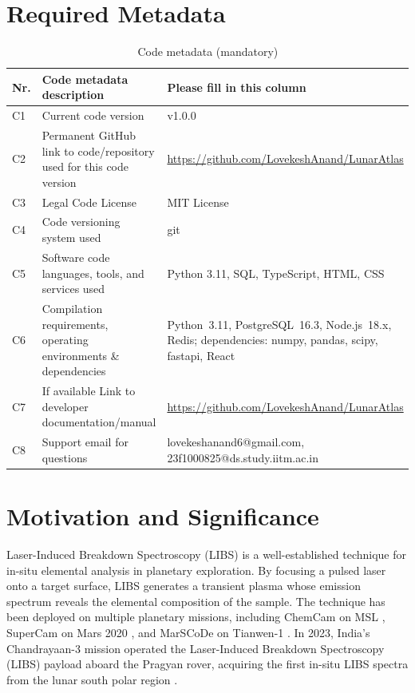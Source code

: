 \documentclass[final,5p,twocolumn,a4paper]{elsarticle}
\begin{document}
\section*{Required Metadata}

\begin{table}[!ht]
\centering
\small
\begin{tabular}{|l|p{7.5cm}|p{7.5cm}|}
\hline
\textbf{Nr.} & \textbf{Code metadata description} & \textbf{Please fill in this column} \\
\hline
C1 & Current code version & v1.0.0 \\
\hline
C2 & Permanent GitHub link to code/repository used for this code version & \href{https://github.com/LovekeshAnand/LunarAtlas}{https://github.com/LovekeshAnand/LunarAtlas} \\
\hline
C3 & Legal Code License & MIT License \\
\hline
C4 & Code versioning system used & git \\
\hline
C5 & Software code languages, tools, and services used & Python 3.11, SQL, TypeScript, HTML, CSS \\
\hline
C6 & Compilation requirements, operating environments \& dependencies & Python~3.11, PostgreSQL~16.3, Node.js~18.x, Redis; dependencies: numpy, pandas, scipy, fastapi, React \\
\hline
C7 & If available Link to developer documentation/manual & \href{https://github.com/LovekeshAnand/LunarAtlas}{https://github.com/LovekeshAnand/LunarAtlas} \\
\hline
C8 & Support email for questions & lovekeshanand6@gmail.com, 23f1000825@ds.study.iitm.ac.in \\
\hline
\end{tabular}
\caption{Code metadata (mandatory)}
\label{table:metadata} 
\end{table}

\section{Motivation and Significance}

Laser-Induced Breakdown Spectroscopy (LIBS) is a well-established technique for in-situ elemental analysis in planetary exploration. By focusing a pulsed laser onto a target surface, LIBS generates a transient plasma whose emission spectrum reveals the elemental composition of the sample. The technique has been deployed on multiple planetary missions, including ChemCam on MSL \cite{maurice2012chemcam, wiens2012chemcam}, SuperCam on Mars 2020 \cite{maurice2021supercam, wiens2021supercam}, and MarSCoDe on Tianwen-1 \cite{xu2021marscode}. In 2023, India's Chandrayaan-3 mission operated the Laser-Induced Breakdown Spectroscopy (LIBS) payload aboard the Pragyan rover, acquiring the first in-situ LIBS spectra from the lunar south polar region \cite{megala2024chandrayaan, sridhar2024libs, isro_chandrayaan3_libs}.
\end{document}
